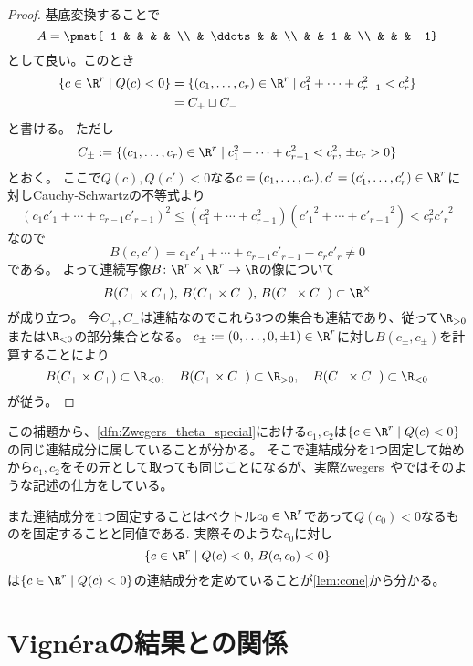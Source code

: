 \documentclass[11pt,b5paper,oneside,lualatex]{ltjsarticle} %
\numberwithin{equation}{section} %
\begin{document}
\begin{proof}
	基底変換することで
	\[
	A = \pmat{ 1 & & & & \\ & \ddots & & \\ & & 1 & \\ & & & -1}
	\]
	として良い。このとき
	\begin{align}
		\{ c \in \R^r \mid Q(c) < 0 \}
		&= \{ (c_1, \dots, c_r) \in \R^r \mid c_1^2 + \cdots + c_{r-1}^2 < c_r^2 \}
		\\
		&= C_+ \sqcup C_-
	\end{align}
	と書ける。
	ただし
	\[
	C_\pm :=  \{ (c_1, \dots, c_r) \in \R^r \mid c_1^2 + \cdots + c_{r-1}^2 < c_r^2, \, \pm c_r > 0 \}
	\]
	とおく。
	ここで$ Q(c), Q(c') < 0 $なる$ c = (c_1, \dots, c_r), c' = (c'_1, \dots, c'_r) \in \R^r $に対しCauchy-Schwartzの不等式より
	\[
	(c_1 c'_1 + \cdots + c_{r-1} c'_{r-1})^2
	\le
	(c_1^2 + \cdots + c_{r-1}^2) ({c'_1}^2 + \cdots + {c'_{r-1}}^2)
	<
	c_r^2 {c'_r}^2
	\]
	なので
	\[
	B(c, c') = c_1 c'_1 + \cdots + c_{r-1} c'_{r-1} - c_r c'_r \neq 0
	\]
	である。
	よって連続写像$ B \colon \R^r \times \R^r \to \R $の像について
	\[
	B(C_+ \times C_+), \,
	B(C_+ \times C_-), \,
	B(C_- \times C_-) \subset \R^\times
	\]
	が成り立つ。
	今$ C_+, C_- $は連結なのでこれら$ 3 $つの集合も連結であり、従って$ \R_{>0} $または$ \R_{<0} $の部分集合となる。
	$ c_\pm := (0, \dots, 0, \pm 1) \in \R^r $に対し$ B(c_\pm, c_\pm) $を計算することにより
	\[
	B(C_+ \times C_+) \subset \R_{<0}, \quad
	B(C_+ \times C_-) \subset \R_{>0}, \quad
	B(C_- \times C_-) \subset \R_{<0}
	\]
	が従う。
\end{proof}

この補題から、\cref{dfn:Zwegers_theta_special}における$ c_1, c_2 $は$ \{ c \in \R^r \mid Q(c) < 0 \} $の同じ連結成分に属していることが分かる。
そこで連結成分を$ 1 $つ固定して始めから$ c_1, c_2 $をその元として取っても同じことになるが、実際Zwegers~\cite{Zwegers_thesis}や\cite{BFOR}ではそのような記述の仕方をしている。

また連結成分を$ 1 $つ固定することはベクトル$ c_0 \in \R^r $であって$ Q(c_0) < 0 $なるものを固定することと同値である.
実際そのような$ c_0 $に対し
\[
\{ c \in \R^r \mid Q(c) < 0, \, B(c, c_0) < 0 \}
\]
は$ \{ c \in \R^r \mid Q(c) < 0 \} $の連結成分を定めていることが\cref{lem:cone}から分かる。


\section{Vign\'{e}raの結果との関係} \label{sec:}
\end{document}
